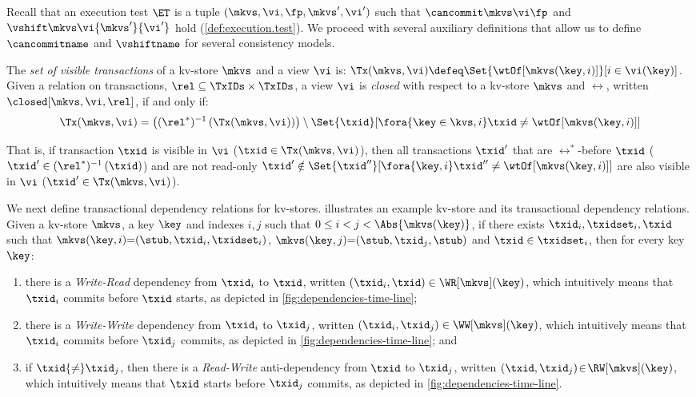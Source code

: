 Recall that an execution test \(\ET\) is a tuple \((\mkvs,\vi, \fp, \allowbreak \mkvs', \vi')\) such that 
\(\cancommit \mkvs \vi \fp\) and \(\vshift \mkvs \vi {\mkvs'} {\vi'}\) hold (\cref{def:execution.test}).
We proceed with several auxiliary definitions that allow us to define \(\cancommitname\) and \(\vshiftname\) for several consistency models. 



The {\em set of visible transactions} of a kv-store \(\mkvs\) and a view \(\vi\) is:
\( \Tx(\mkvs, \vi)  \defeq \Set{\wtOf[\mkvs(\key, i)] }[ i \in \vi(\key)] \).
Given a relation on transactions, \(\rel \subseteq \TxIDs \times \TxIDs\),
a view \(\vi\) is \emph{closed} with respect to a kv-store \(\mkvs\)
and \(\rel\), written \(\closed[\mkvs,\vi,\rel]\),  if and only if:
\[
	\Tx(\mkvs, \vi) = 
	\left( (\rel^*)^{-1} \left( \Tx(\mkvs, \vi) \right) \right) \setminus \Set{\txid }[ \fora{\key \in \kvs ,i} \txid \neq \wtOf[\mkvs(\key,i)] ]
\]

That is, if transaction \(\txid\) is visible in \(\vi\) (\( \txid \in \Tx(\mkvs, \vi) \)),
then all transactions \( \txid'  \) that are \(\rel^*\)-before \(\txid\) (\(\txid' \in (\rel^*)^{-1} \left( \txid \right)\))
and are not read-only \( \txid' \notin \Set{\txid'' }[ \fora{\key,i} \txid'' \neq \wtOf[\mkvs(\key,i)] ] \)
are also visible in \(\vi\) (\( \txid' \in \Tx(\mkvs, \vi) \)).

We next define transactional dependency relations for kv-stores.
 illustrates an example kv-store and
its transactional dependency relations.
Given a kv-store \(\mkvs\), a key \(\key\) and 
indexes \(i,j\) such that  \(0 \leq i < j < \Abs{ \mkvs(\key) }\), 
if there exists \(\txid_i, \txidset_i, \txid\) such that 
\(\mkvs(\key, i)  {=} (\stub, \txid_{i}, \txidset_{i})\), \(\mkvs(\key,j) {=} (\stub, \txid_{j}, \stub)\)
and \(\txid \in \txidset_{i}\), 
then for every key \( \key \):

\begin{enumerate} 
\item there is a \emph{Write-Read} dependency from \(\txid_{i}\) to \(\txid\), written \((\txid_{i},\txid) \in \WR[\mkvs](\key)\),
which intuitively means that \( \txid_{i} \) commits before \( \txid \) starts, as depicted in \cref{fig:dependencies-time-line};
\item there is a \emph{Write-Write} dependency from \(\txid_{i}\) to \(\txid_{j}\), 
written \((\txid_{i},\txid_{j}) \in \WW[\mkvs](\key) \),
which intuitively means that \( \txid_{i} \) commits before \( \txid_j \) commits, as depicted in \cref{fig:dependencies-time-line}; and 
\item if \(\txid {\neq} \txid_{j}\), then there is a \emph{Read-Write} anti-dependency from \(\txid\) to \(\txid_{j}\), written \((\txid,\txid_j) \!\in\! \RW[\mkvs](\key)\),
which intuitively means that \( \txid \) starts before \( \txid_j \) commits, as depicted in \cref{fig:dependencies-time-line}.
\end{enumerate}

